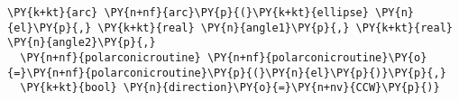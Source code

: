 \begin{Verbatim}[commandchars=\\\{\}]
  \PY{k+kt}{arc} \PY{n+nf}{arc}\PY{p}{(}\PY{k+kt}{ellipse} \PY{n}{el}\PY{p}{,} \PY{k+kt}{real} \PY{n}{angle1}\PY{p}{,} \PY{k+kt}{real} \PY{n}{angle2}\PY{p}{,}
  \PY{n+nf}{polarconicroutine} \PY{n+nf}{polarconicroutine}\PY{o}{=}\PY{n+nf}{polarconicroutine}\PY{p}{(}\PY{n}{el}\PY{p}{)}\PY{p}{,}
  \PY{k+kt}{bool} \PY{n}{direction}\PY{o}{=}\PY{n+nv}{CCW}\PY{p}{)}
\end{Verbatim}
